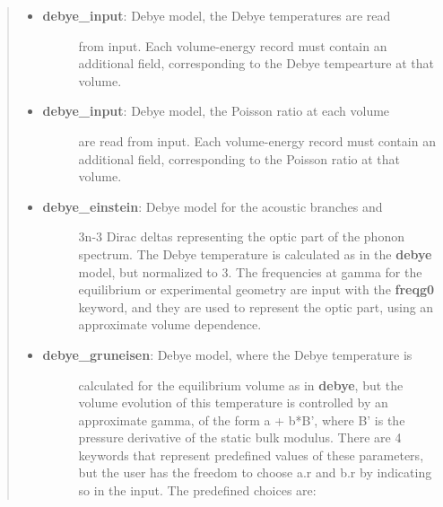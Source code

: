 \documentclass[a4paper]{article}
\begin{document}
\begin{itemize}
\begin{quote}
\begin{itemize}
\begin{description}
\end{description}

\item %
\begin{description}
\item[{\textbf{debye\_input}: Debye model, the Debye temperatures are read}] \leavevmode 
from input. Each volume-energy record must contain an
additional field, corresponding to the Debye tempearture at
that volume.

\end{description}

\item %
\begin{description}
\item[{\textbf{debye\_input}: Debye model, the Poisson ratio at each volume}] \leavevmode 
are read from input. Each volume-energy record must contain an
additional field, corresponding to the Poisson ratio at
that volume.

\end{description}

\item %
\begin{description}
\item[{\textbf{debye\_einstein}: Debye model for the acoustic branches and}] \leavevmode 
3n-3 Dirac deltas representing the optic part of the phonon
spectrum. The Debye temperature is calculated as in the
\textbf{debye} model, but normalized to 3. The frequencies at gamma
for the equilibrium or experimental geometry are input with the
\textbf{freqg0} keyword, and they are used to represent the optic
part, using an approximate volume dependence.

\end{description}

\item %
\begin{description}
\item[{\textbf{debye\_gruneisen}: Debye model, where the Debye temperature is}] \leavevmode 
calculated for the equilibrium volume as in \textbf{debye}, but the
volume evolution of this temperature is controlled by an
approximate gamma, of the form a + b*B', where B' is the
pressure derivative of the static bulk modulus. There are 4
keywords that represent predefined values of these parameters,
but the user has the freedom to choose a.r and b.r by
indicating so in the input. The predefined choices are:
%
\begin{itemize}


\end{itemize}
\end{description}
\end{itemize}
\end{quote}
\end{itemize}
\end{document}
